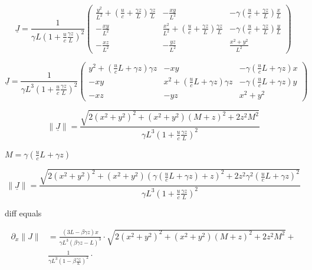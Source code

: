 \begin{equation}
	\underline{J} =
	\frac{1}{\gamma  L ( 1 + \frac{u}{c} \frac{\gamma z}{L} )^2}
	\begin{pmatrix}
		\frac{y^2}{ L^2} +\left( \frac{u}{c}  + \frac{ \gamma z }{L} \right)   \frac{\gamma z}{ L}  & - \frac{xy}{L^2}  & - \gamma ( \frac{u}{c}  + \frac{ \gamma z }{L} ) \frac{x}{L} \\
		- \frac{xy}{L^2}  & \frac{x^2}{ L^2} + \left( \frac{u}{c}  + \frac{ \gamma z }{L} \right)   \frac{\gamma z}{ L}  & - \gamma (  \frac{u}{c}  + \frac{\gamma z }{L} ) \frac{y}{L}
		\\
		- \frac{xz}{L^2} & - \frac{yz}{L^2} & \frac{ x^2 + y^2 }{ L^2}
	\end{pmatrix}
\end{equation}

\begin{equation}
	\underline{J} =
	\frac{1}{\gamma  L^3 ( 1 + \frac{u}{c} \frac{\gamma z}{L} )^2}
	\begin{pmatrix}
		y^2 +\left( \frac{u}{c} L +  \gamma z \right) \gamma z  & -xy & - \gamma ( \frac{u}{c} L + \gamma z  ) x \\
		- xy  & x^2 + \left( \frac{u}{c} L  +  \gamma z \right) \gamma z  & - \gamma (  \frac{u}{c}L  + \gamma z  ) y
		\\
		- xz & - yz &  x^2 + y^2
	\end{pmatrix}
\end{equation}

\begin{equation}
	\|\underline{J}\| = \frac{\sqrt{ 2 ( x^2+ y^2 )^2 + (x^2+y^2)(M+z)^2 + 2 z^2 M^2 } }{\gamma  L^3 ( 1 + \frac{u}{c} \frac{\gamma z}{L} )^2 }
\end{equation}

$M= \gamma (  \frac{u}{c}L  + \gamma z  )$

\begin{equation}
	\|\underline{J}\| = \frac{\sqrt{ 2 ( x^2+ y^2 )^2 + (x^2+y^2)(\gamma (  \frac{u}{c}L  + \gamma z  )+z)^2 + 2 z^2 \gamma^2 (  \frac{u}{c}L  + \gamma z  )^2 } }{\gamma  L^3 ( 1 + \frac{u}{c} \frac{\gamma z}{L} )^2 }
\end{equation}

diff equals

\begin{equation}
	\begin{aligned}
	\partial_x \| J\| &= \frac{(3L-\beta\gamma z)x}{\gamma L^3(\beta\gamma z - L)^3} \cdot \sqrt{ 2 ( x^2+ y^2 )^2 + (x^2+y^2)(M+z)^2 + 2 z^2 M^2 } +  \\
	& \frac{1}{\gamma L^3 (1-\beta\frac{\gamma z}{L})^2} \cdot
	\end{aligned}
\end{equation}

